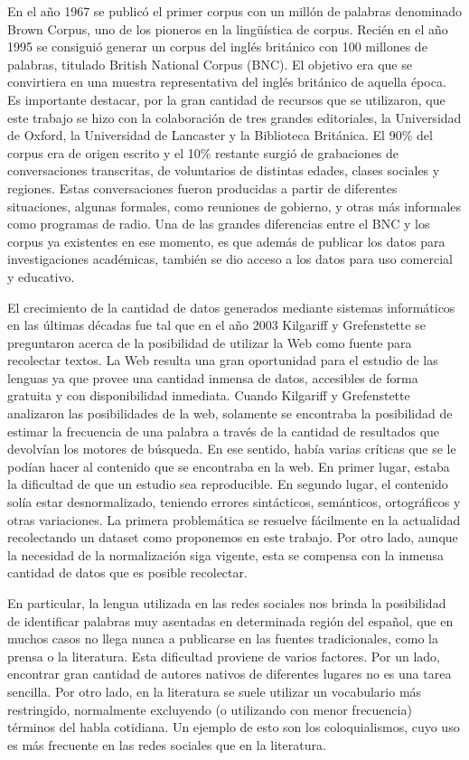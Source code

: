 En el año 1967 se publicó el primer corpus con un millón de palabras denominado Brown Corpus, uno de los pioneros en la lingüística de corpus. Recién en el año 1995 se consiguió generar un corpus del inglés británico con 100 millones de palabras, titulado British National Corpus (BNC). 
El objetivo era que se convirtiera en una muestra representativa del inglés británico de aquella época. 
Es importante destacar, por la gran cantidad de recursos que se utilizaron, que este trabajo se hizo con la colaboración de tres grandes editoriales, la Universidad de Oxford, la Universidad de Lancaster y la Biblioteca Británica. 
El 90\% del corpus era de origen escrito y el 10\% restante surgió de grabaciones de conversaciones transcritas, de voluntarios de distintas edades, clases sociales y regiones. 
Estas conversaciones fueron producidas a partir de diferentes situaciones, algunas formales, como reuniones de gobierno, y otras más informales como programas de radio. 
Una de las grandes diferencias entre el BNC y los corpus ya existentes en ese momento, es que además de publicar los datos para investigaciones académicas, también se dio acceso a los datos para uso comercial y educativo.

El crecimiento de la cantidad de datos generados mediante sistemas informáticos en las últimas décadas fue tal que en el año 2003 Kilgariff y Grefenstette \cite{kilgarriff2003introduction} se preguntaron acerca de la posibilidad de utilizar la Web como fuente para recolectar textos.
La Web resulta una gran oportunidad para el estudio de las lenguas ya que provee una cantidad inmensa de datos, accesibles de forma gratuita y con disponibilidad inmediata. Cuando Kilgariff y Grefenstette  analizaron las posibilidades de la web, solamente se encontraba la posibilidad de estimar la frecuencia de una palabra a través de la cantidad de resultados que devolvían los motores de búsqueda. En ese sentido, había varias críticas que se le podían hacer al contenido que se encontraba en la web. En primer lugar, estaba la dificultad de que un estudio sea reproducible. En segundo lugar, el contenido solía estar desnormalizado, teniendo errores sintácticos, semánticos, ortográficos y otras variaciones. La primera problemática se resuelve fácilmente en la actualidad recolectando un dataset como proponemos en este trabajo. Por otro lado, aunque la necesidad de la normalización siga vigente, esta se compensa con la inmensa cantidad de datos que es posible recolectar.

En particular, la lengua utilizada en las redes sociales nos brinda la posibilidad de identificar palabras muy asentadas en determinada región del español, que en muchos casos no llega nunca a publicarse en las fuentes tradicionales, como la prensa o la literatura. Esta dificultad proviene de varios factores. Por un lado, encontrar gran cantidad de autores nativos de diferentes lugares no es una tarea sencilla. Por otro lado, en la literatura se suele utilizar un vocabulario más restringido, normalmente excluyendo (o utilizando con menor frecuencia) términos del habla cotidiana. Un ejemplo de esto son los coloquialismos, cuyo uso es más frecuente en las redes sociales que en la literatura. 

